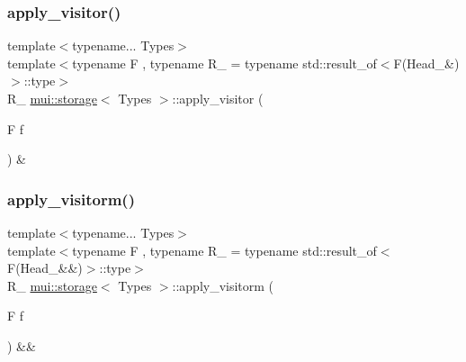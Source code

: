 \mbox{\label{structmui_1_1storage_a3efda26f5657d61c19416569661c3898}} 
\subsubsection{\texorpdfstring{apply\+\_\+visitor()}{apply\_visitor()}\hspace{0.1cm}{\footnotesize\ttfamily [2/2]}}
{\footnotesize\ttfamily template$<$typename... Types$>$ \\
template$<$typename F , typename R\+\_\+  = typename std\+::result\+\_\+of$<$\+F(\+Head\+\_\+\&)$>$\+::type$>$ \\
R\+\_\+ \hyperlink{structmui_1_1storage}{mui\+::storage}$<$ Types $>$\+::apply\+\_\+visitor (\begin{DoxyParamCaption}\item[{F}]{f }\end{DoxyParamCaption}) \&\hspace{0.3cm}{\ttfamily [inline]}}

\mbox{\label{structmui_1_1storage_ad1a6366fdb20d61f0bc2ac2fd8b6323b}} 
\subsubsection{\texorpdfstring{apply\+\_\+visitorm()}{apply\_visitorm()}}
{\footnotesize\ttfamily template$<$typename... Types$>$ \\
template$<$typename F , typename R\+\_\+  = typename std\+::result\+\_\+of$<$\+F(\+Head\+\_\+\&\&)$>$\+::type$>$ \\
R\+\_\+ \hyperlink{structmui_1_1storage}{mui\+::storage}$<$ Types $>$\+::apply\+\_\+visitorm (\begin{DoxyParamCaption}\item[{F}]{f }\end{DoxyParamCaption}) \&\&\hspace{0.3cm}{\ttfamily [inline]}}

\mbox{\label{structmui_1_1storage_a7772a509f7ad3fdbade17be39341460b}} 
